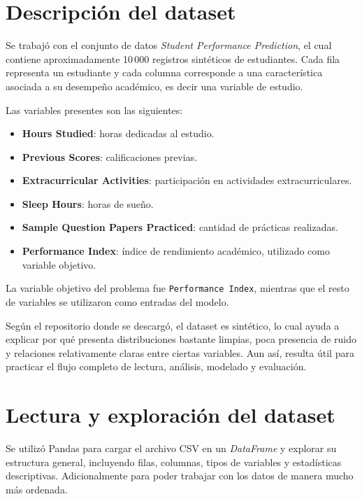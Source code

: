 \documentclass[conference]{IEEEtran}
\begin{document}
\section{Descripción del dataset}

Se trabajó con el conjunto de datos \textit{Student Performance Prediction}, el cual contiene aproximadamente 10\,000 registros sintéticos de estudiantes. Cada fila representa un estudiante y cada columna corresponde a una característica asociada a su desempeño académico, es decir una variable de estudio.

Las variables presentes son las siguientes:

\begin{itemize}
    \item \textbf{Hours Studied}: horas dedicadas al estudio.
    \item \textbf{Previous Scores}: calificaciones previas.
    \item \textbf{Extracurricular Activities}: participación en actividades extracurriculares.
    \item \textbf{Sleep Hours}: horas de sueño.
    \item \textbf{Sample Question Papers Practiced}: cantidad de prácticas realizadas.
    \item \textbf{Performance Index}: índice de rendimiento académico, utilizado como variable objetivo.
\end{itemize}

La variable objetivo del problema fue \texttt{Performance Index}, mientras que el resto de variables se utilizaron como entradas del modelo.

Según el repositorio donde se descargó, el dataset es sintético, lo cual ayuda a explicar por qué presenta distribuciones bastante limpias, poca presencia de ruido y relaciones relativamente claras entre ciertas variables. Aun así, resulta útil para practicar el flujo completo de lectura, análisis, modelado y evaluación.

\section{Lectura y exploración del dataset}

Se utilizó Pandas para cargar el archivo CSV en un \textit{DataFrame} y explorar su estructura general, incluyendo filas, columnas, tipos de variables y estadísticas descriptivas. Adicionalmente para poder trabajar con los datos de manera mucho más ordenada.
\end{document}
